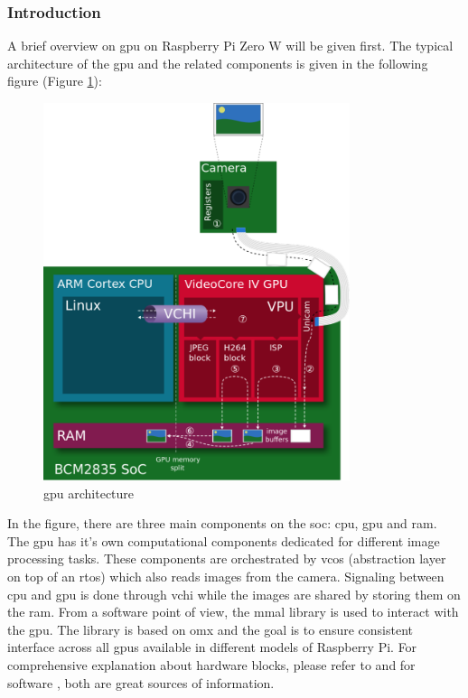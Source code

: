 \subsubsection{Introduction}
A brief overview on \ac{gpu} on Raspberry Pi Zero W will be given first. The typical architecture of the \ac{gpu} and the related components is given in the following figure (Figure \ref{fig:physical:gpu_architecture}):
 
 \begin{figure}[H]
    \centering
    \includegraphics[width=0.8\textwidth]{physical/figures/gpu_architecture}
    \caption{\ac{gpu} architecture \cite{jones_videocore_nodate-1}}
    \label{fig:physical:gpu_architecture}
\end{figure}

In the figure, there are three main components on the \ac{soc}: \ac{cpu}, \ac{gpu} and \ac{ram}.
The \ac{gpu} has it's own computational components dedicated for different image processing tasks.
These components are orchestrated by \ac{vcos} (abstraction layer on top of an \ac{rtos}) which also reads images from the camera.
Signaling between \ac{cpu} and \ac{gpu} is done through \ac{vchi} while the images are shared by storing them on the \ac{ram}.
From a software point of view, the \ac{mmal} library is used to interact with the \ac{gpu}.
The library is based on \ac{omx} and the goal is to ensure consistent interface across all \acp{gpu} available in different models of Raspberry Pi.
For comprehensive explanation about hardware blocks, please refer to \cite{jones_videocore_nodate-1} and for software \cite{jones_videocore_nodate}, both are great sources of information.

